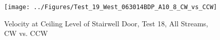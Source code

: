 \documentclass[12pt,oneside]{book}
\begin{document}
\begin{figure}[!ht]
\texttt{[image: ../Figures/Test\_19\_West\_063014BDP\_A10\_8\_CW\_vs\_CCW]}
\caption{Velocity at Ceiling Level of Stairwell Door, Test 18, All Streams, CW vs. CCW}
\label{fig:Test_18_West_063014_SS_BDP_A10}
\end{figure}

\clearpage
%
%
%
%
%
%
%
%
%
%
\end{document}
